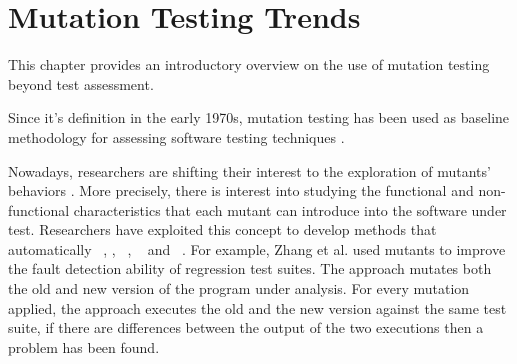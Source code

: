 
\chapter{Mutation Testing Trends}
\label{chapter:trends}



This chapter provides an introductory overview on the use of mutation testing beyond test assessment.

Since it's definition in the early 1970s, mutation testing has been used 
as baseline methodology for assessing software testing techniques \cite{chekam2017empirical}.


Nowadays, researchers are shifting their interest to the exploration of mutants' behaviors \cite{papadakis2019mutation}. 
More precisely, there is interest into studying the functional and non-functional characteristics that each mutant can introduce into the software under test.
Researchers have exploited this concept to develop methods that automatically ~\cite{zhang2016isomorphic},  \cite{papadakis2015metallaxis}, ~\cite{le2011genprog}, ~\cite{loise2017towards} and ~\cite{langdon2017genetic}.
For example, Zhang et al. \cite{zhang2016isomorphic} used mutants to improve the fault detection ability of regression test suites. The approach mutates both the old and new version of the program under analysis. For every mutation applied, the approach executes the old and the new version against the same test suite, if there are differences between the output of the two executions then a problem has been found.


